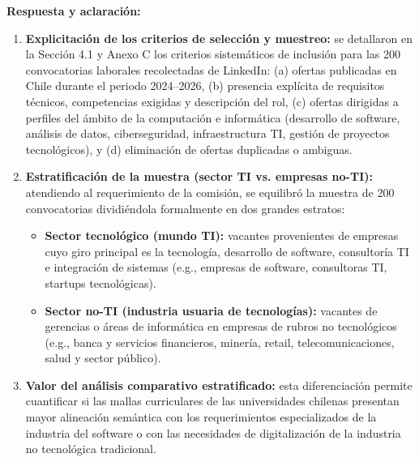 \noindent
\textbf{Respuesta y aclaración:}
\begin{enumerate}[leftmargin=*]
	\item \textbf{Explicitación de los criterios de selección y muestreo:} se detallaron en la Sección 4.1 y Anexo C los criterios sistemáticos de inclusión para las 200 convocatorias laborales recolectadas de LinkedIn: (a) ofertas publicadas en Chile durante el periodo 2024–2026, (b) presencia explícita de requisitos técnicos, competencias exigidas y descripción del rol, (c) ofertas dirigidas a perfiles del ámbito de la computación e informática (desarrollo de software, análisis de datos, ciberseguridad, infraestructura TI, gestión de proyectos tecnológicos), y (d) eliminación de ofertas duplicadas o ambiguas.
	\item \textbf{Estratificación de la muestra (sector TI vs. empresas no-TI):} atendiendo al requerimiento de la comisión, se equilibró la muestra de 200 convocatorias dividiéndola formalmente en dos grandes estratos:
	      \begin{itemize}
		      \item \textbf{Sector tecnológico (mundo TI):} vacantes provenientes de empresas cuyo giro principal es la tecnología, desarrollo de software, consultoría TI e integración de sistemas (e.g., empresas de software, consultoras TI, startups tecnológicas).
		      \item \textbf{Sector no-TI (industria usuaria de tecnologías):} vacantes de gerencias o áreas de informática en empresas de rubros no tecnológicos (e.g., banca y servicios financieros, minería, retail, telecomunicaciones, salud y sector público).
	      \end{itemize}
	\item \textbf{Valor del análisis comparativo estratificado:} esta diferenciación permite cuantificar si las mallas curriculares de las universidades chilenas presentan mayor alineación semántica con los requerimientos especializados de la industria del software o con las necesidades de digitalización de la industria no tecnológica tradicional.
\end{enumerate}

\vspace{0.6cm}
\newpage
\hypersetup{pageanchor=true}
